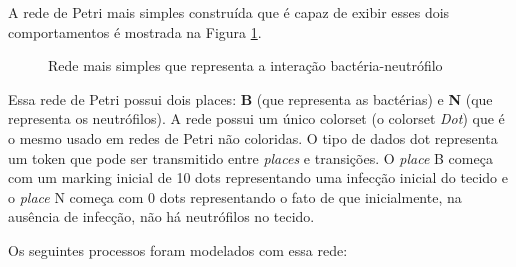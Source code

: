 \documentclass[a4paper,10pt]{article}
\begin{document}
		A rede de Petri mais simples construída que é capaz de exibir esses dois comportamentos é mostrada na Figura \ref{fig:primeiraRede}. 
	
		\begin{figure}
			\begin{center}
				
			\end{center}
			\caption{Rede mais simples que representa a interação bactéria-neutrófilo}
			\label{fig:primeiraRede}
		\end{figure}

		Essa rede de Petri possui dois places: \textbf{B} (que representa as bactérias) e \textbf{N} (que representa os
		neutrófilos). A rede possui um único colorset (o colorset \textit{Dot}) que é o mesmo usado em redes de Petri não
		coloridas. O tipo de dados dot representa um token que pode ser transmitido entre \textit{places} e transições.
		O \textit{place} B começa com um marking inicial de 10 dots representando uma infecção inicial do tecido e o
		\textit{place} N começa com 0 dots representando o fato de que inicialmente, na ausência de infecção, não há
		neutrófilos no tecido.
		
		Os seguintes processos foram modelados com essa rede:
		
\end{document}
